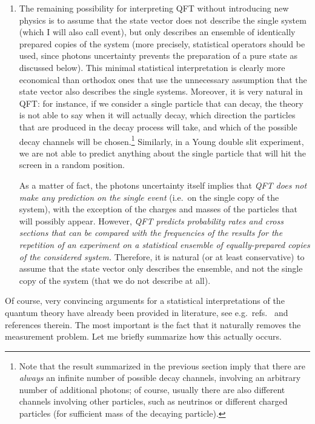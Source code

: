 \documentclass[published]{JHEP3}
\begin{document}
{\begin{enumerate}
\item The remaining possibility for interpreting QFT without
introducing new physics is to assume that the state vector does
not describe the single system (which I will also call event), but
only describes an ensemble of identically prepared copies of the
system (more precisely, statistical operators should be used,
since photons uncertainty prevents the preparation of a pure state
as discussed below). This minimal statistical interpretation is
clearly more economical than orthodox ones that use the
unnecessary assumption that the state vector also describes the
single systems. Moreover, it is very natural in QFT: for instance,
if we consider a single particle that can decay, the theory is not
able to say when it will actually decay, which direction the
particles that are produced in the decay process will take, and
which of the possible decay channels will be chosen.\footnote{Note
that the result summarized in the previous section imply that
there are \emph{always} an infinite number of possible decay
channels, involving an arbitrary number of additional photons; of
course, usually there are also different channels involving other
particles, such as neutrinos or different charged particles (for
sufficient mass of the decaying particle).} Similarly, in a Young
double slit experiment, we are not able to predict anything about
the single particle that will hit the screen in a random position.

As a matter of fact, the photons uncertainty itself implies that
\emph{QFT does not make any prediction on the single event} (i.e.\ on
the single copy of the system), with the exception of the charges and
masses of the particles that will possibly appear.  However, \emph{QFT
predicts probability rates and cross sections that can be compared
with the frequencies of the results for the repetition of an
experiment on a statistical ensemble of equally-prepared copies of the
considered system.} Therefore, it is natural (or at least
conservative) to assume that the state vector only describes the
ensemble, and not the single copy of the system (that we do not
describe at all).
\end{enumerate}}

Of course, very convincing arguments for a statistical
interpretations of  the quantum theory have already been provided
in literature, see e.g.\ refs.~\cite{Ballentine70,Belinfante,BJ}
and references therein. The most important is the fact that it
naturally removes the measurement problem. Let me briefly
summarize how this actually occurs.
\end{document}
